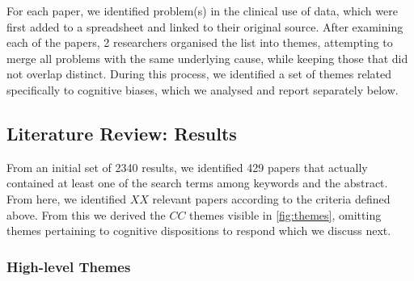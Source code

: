 \documentclass{sigchi}
\begin{document}
For each paper, we identified problem(s) in the clinical use of data, which were first added to a spreadsheet and linked to their original source.  After examining each of the papers, 2 researchers organised the list into themes, attempting to merge all problems with the same underlying cause, while keeping those that did not overlap distinct.  During this process, we identified a set of themes related specifically to cognitive biases, which we analysed and report separately below.

\subsection{Literature Review: Results}

From an initial set of 2340 results, we identified 429 papers that actually contained at least one of the search terms among keywords and the abstract. From here, we identified $XX$ relevant papers according to the criteria defined above.  From this we derived the $CC$ themes visible in \ref{fig:themes}, omitting themes pertaining to cognitive dispositions to respond which we discuss next.

\subsubsection{High-level Themes}




\end{document}
